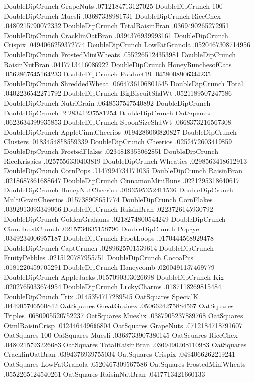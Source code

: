 DoubleDipCrunch	GrapeNuts	.0712184713127025
DoubleDipCrunch	100%
DoubleDipCrunch	Muesli	.03687338981731
DoubleDipCrunch	RiceChex	.0480215790072332
DoubleDipCrunch	TotalRaisinBran	.0369490265272951
DoubleDipCrunch	CracklinOatBran	.0394376939993161
DoubleDipCrunch	Crispix	.0494066259372774
DoubleDipCrunch	LowFatGranola	.0520467308714956
DoubleDipCrunch	FrostedMiniWheats	.0552265124353981
DoubleDipCrunch	RaisinNutBran	.0417713416086922
DoubleDipCrunch	HoneyBunchesofOats	.0562867645164233
DoubleDipCrunch	Product19	.0458008906344235
DoubleDipCrunch	ShreddedWheat	.0664736106801545
DoubleDipCrunch	Total	.0402236542271792
DoubleDipCrunch	BigBiscuitShdWt	.0521189507247586
DoubleDipCrunch	NutriGrain	.0648537547540892
DoubleDipCrunch	DoubleDipCrunch	-2.28341237581254
DoubleDipCrunch	OatSquares	.0623634399935853
DoubleDipCrunch	SpoonSizeShdWt	.0668373216567308
DoubleDipCrunch	AppleCinn.Cheerios	.0194286060820827
DoubleDipCrunch	Clusters	.0183454858559339
DoubleDipCrunch	Cheerios	.0252472603419859
DoubleDipCrunch	FrostedFlakes	.0234818355062851
DoubleDipCrunch	RiceKrispies	.0257556330403819
DoubleDipCrunch	Wheaties	.0298563418612913
DoubleDipCrunch	CornPops	.0147994734171035
DoubleDipCrunch	RaisinBran	.0218687861688647
DoubleDipCrunch	CinnamonMiniBuns	.0221295318640617
DoubleDipCrunch	HoneyNutCheerios	.0193595352411536
DoubleDipCrunch	MultiGrainCheerios	.015738908651774
DoubleDipCrunch	CornFlakes	.0392913093349066
DoubleDipCrunch	RaisinBran	.0223726145930792
DoubleDipCrunch	GoldenGrahams	.0218274800544249
DoubleDipCrunch	Cinn.ToastCrunch	.0215734635158796
DoubleDipCrunch	Popeye	.0349234006957187
DoubleDipCrunch	FrootLoops	.0170444568929478
DoubleDipCrunch	CaptCrunch	.0289625701539614
DoubleDipCrunch	FruityPebbles	.0215120787955751
DoubleDipCrunch	CocoaPus	.0181220459705291
DoubleDipCrunch	Honeycomb	.0200491157469779
DoubleDipCrunch	AppleJacks	.0157090303026698
DoubleDipCrunch	Kix	.0202765033674954
DoubleDipCrunch	LuckyCharms	.0187118269815484
DoubleDipCrunch	Trix	.0145354717289545
OatSquares	SpecialK	.044905706560842
OatSquares	GreatGraines	.0506624275884567
OatSquares	Triples	.0680905520752237
OatSquares	Mueslix	.0387905237889768
OatSquares	OtmlRaisinCrisp	.042446449666804
OatSquares	GrapeNuts	.0712184718791607
OatSquares	100%
OatSquares	Muesli	.0368733907380145
OatSquares	RiceChex	.0480215793226683
OatSquares	TotalRaisinBran	.0369490268110983
OatSquares	CracklinOatBran	.0394376939755034
OatSquares	Crispix	.0494066262219241
OatSquares	LowFatGranola	.0520467309567586
OatSquares	FrostedMiniWheats	.0552265124540261
OatSquares	RaisinNutBran	.0417713421660133
